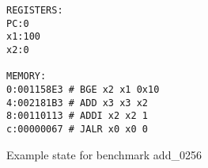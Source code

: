 \begin{figure}
    \centering
    \begin{verbatim}
REGISTERS:
PC:0
x1:100
x2:0

MEMORY:
0:001158E3 # BGE x2 x1 0x10
4:002181B3 # ADD x3 x3 x2
8:00110113 # ADDI x2 x2 1
c:00000067 # JALR x0 x0 0
    \end{verbatim}
    \caption[State of benchmark add\_0256]{Example state for benchmark
        add\_0256}\label{fig:bench_example}
\end{figure}